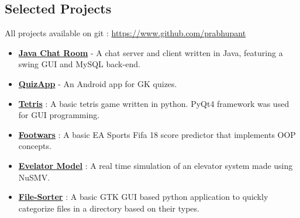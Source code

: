 \documentclass[margin, centered]{res}
\begin{document}
\begin{resume}
\section{Selected Projects}
All projects available on git : \url{https://www.github.com/prabhupant}
\begin{itemize}[leftmargin=*]
 \item \textbf{\href{https://github.com/prabhupant/java-chatroom}{Java Chat Room}} - A chat server and client written in Java, featuring a swing GUI and MySQL back-end.
 \item \textbf{\href{https://github.com/prabhupant/QuizApp}{QuizApp}} - An Android app for GK quizes.
 \item \textbf{\href{https://github.com/prabhupant/Tetris}{Tetris}} : A basic tetris game written in python. PyQt4 framework was used for GUI programming.
 \item \textbf{\href{https://github.com/prabhupant/footwars}{Footwars}} : A basic EA Sports Fifa 18 score predictor that implements OOP concepts.
 \item \textbf{\href{https://github.com/prabhupant/elevator-model}{Evelator Model}} : A real time simulation of an elevator system made using NuSMV.
 \item \textbf{\href{https://github.com/prabhupant/file-sorter}{File-Sorter}} : A basic GTK GUI based python application to quickly categorize files in a directory based on their types. 


\end{itemize}



\end{resume}
\end{document}
